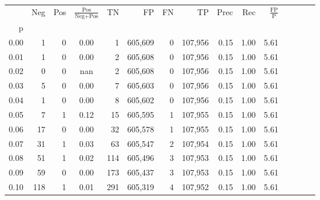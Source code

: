 \begin{tabular}{rrrcrrrrrrrrrrr}
\toprule
{} &     Neg &    Pos & $\frac{\text{Pos}}{\text{Neg}+\text{Pos}}$ &       TN &       FP &       FN &       TP &  Prec &   Rec & $\frac{\text{FP}}{\text{P}}$ \\
p    &         &        &                                            &          &          &          &          &       &       &                              \\
\midrule
0.00 &       1 &      0 &                                       0.00 &        1 &  605,609 &        0 &  107,956 &  0.15 &  1.00 &                         5.61 \\
0.01 &       1 &      0 &                                       0.00 &        2 &  605,608 &        0 &  107,956 &  0.15 &  1.00 &                         5.61 \\
0.02 &       0 &      0 &                                        nan &        2 &  605,608 &        0 &  107,956 &  0.15 &  1.00 &                         5.61 \\
0.03 &       5 &      0 &                                       0.00 &        7 &  605,603 &        0 &  107,956 &  0.15 &  1.00 &                         5.61 \\
0.04 &       1 &      0 &                                       0.00 &        8 &  605,602 &        0 &  107,956 &  0.15 &  1.00 &                         5.61 \\
0.05 &       7 &      1 &                                       0.12 &       15 &  605,595 &        1 &  107,955 &  0.15 &  1.00 &                         5.61 \\
0.06 &      17 &      0 &                                       0.00 &       32 &  605,578 &        1 &  107,955 &  0.15 &  1.00 &                         5.61 \\
0.07 &      31 &      1 &                                       0.03 &       63 &  605,547 &        2 &  107,954 &  0.15 &  1.00 &                         5.61 \\
0.08 &      51 &      1 &                                       0.02 &      114 &  605,496 &        3 &  107,953 &  0.15 &  1.00 &                         5.61 \\
0.09 &      59 &      0 &                                       0.00 &      173 &  605,437 &        3 &  107,953 &  0.15 &  1.00 &                         5.61 \\
0.10 &     118 &      1 &                                       0.01 &      291 &  605,319 &        4 &  107,952 &  0.15 &  1.00 &                         5.61 \\

\end{tabular}
